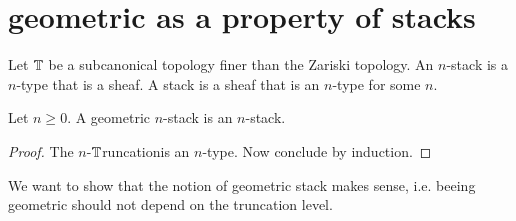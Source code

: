 \documentclass{article}
\newcommand{\truncation}{$\bT$runcation}
\begin{document}
\section{geometric as a property of stacks}

\begin{definition}
Let $\mathbb{T}$ be a subcanonical topology finer than the Zariski topology.
    An $n$-stack is a $n$-type that is a sheaf. A stack is a sheaf that is an $n$-type for some $n$.
\end{definition}
\begin{lemma}
    Let $n \ge 0$. A geometric $n$-stack is an $n$-stack.
\end{lemma}
\begin{proof}
     The $n$-\truncation is an $n$-type. Now conclude by induction.
\end{proof}
We want to show that the notion of geometric stack makes sense, i.e. beeing geometric should not depend on the truncation level. 
\end{document}
